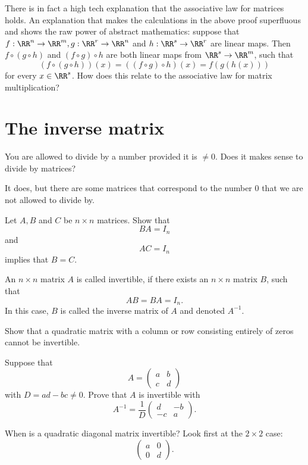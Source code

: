 \documentclass{article}
\begin{document}
\beginshex
There is in fact a high tech explanation that the associative law for matrices holds. An explanation
that makes the calculations in the above proof superfluous and shows the raw power of
abstract mathematics: suppose that
$f: \RR^n\rightarrow \RR^m, g:\RR^r\rightarrow \RR^n$ and $h:\RR^s\rightarrow \RR^r$ are linear maps.
Then $f\circ (g\circ h)$ and $(f\circ g)\circ h$ are both linear maps from $\RR^s\rightarrow \RR^m$, such that
$$
(f\circ (g\circ h))(x) = ((f\circ g)\circ h)(x) = f( g ( h (x)))
$$
for every $x\in \RR^s$. How does this relate to the associative law for matrix
multiplication?
\endshex

\section{The inverse matrix}

You are allowed to divide by a number provided it is $\neq 0$. Does it makes sense
to divide by matrices?

It does, but there are some matrices that correspond to the number $0$ that we are not allowed
to divide by.

\beginshex
Let $A, B$ and $C$ be $n\times n$ matrices. Show that
$$
B A = I_n
$$
and
$$
A C = I_n
$$
implies that $B = C$.
\endshex


\begin{definition}
An $n\times n$ matrix $A$ is called invertible, if there exists an  $n\times n$ matrix $B$, such that 
$$
A B = B A = I_n.
$$
In this case, $B$ is called the inverse matrix of $A$ and denoted $A^{-1}$.
\end{definition}


\beginshex
Show that a quadratic matrix with a column or row consisting entirely of zeros cannot
be invertible.
\endshex

\beginshex
Suppose that
$$
A = \begin{pmatrix}
  a & b\\
  c & d
  \end{pmatrix}
  $$
  with $D = a d - b c\neq 0$. Prove that $A$ is invertible with
  $$
  A^{-1} = \frac{1}{D}\begin{pmatrix} d & -b\\ -c & a \end{pmatrix}.
  $$
\endshex


\beginshex
When is a quadratic diagonal matrix invertible? Look first at the $2\times 2$ case:
$$
\begin{pmatrix}
  a & 0\\
  0 & d
\end{pmatrix}.
$$
\endshex
\end{document}
